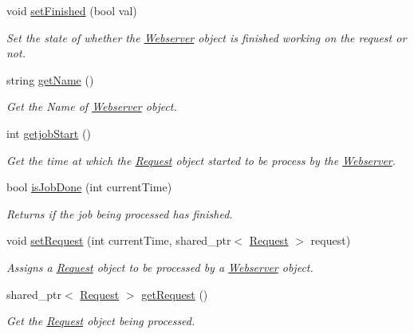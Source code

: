 \begin{DoxyCompactItemize}
void \hyperlink{classWebserver_a385a32307e09550c301660581bada2e5}{set\+Finished} (bool val)
\begin{DoxyCompactList}\small\item\em Set the state of whether the \hyperlink{classWebserver}{Webserver} object is finished working on the request or not. \end{DoxyCompactList}\item 
string \hyperlink{classWebserver_a7947099345655d9deceb05b37e06978c}{get\+Name} ()
\begin{DoxyCompactList}\small\item\em Get the Name of \hyperlink{classWebserver}{Webserver} object. \end{DoxyCompactList}\item 
int \hyperlink{classWebserver_ad1ee2d5ae63d1d2674156eb29c3f92ee}{getjob\+Start} ()
\begin{DoxyCompactList}\small\item\em Get the time at which the \hyperlink{classRequest}{Request} object started to be process by the \hyperlink{classWebserver}{Webserver}. \end{DoxyCompactList}\item 
bool \hyperlink{classWebserver_a25d0b2f418c84058bb49408aacee9745}{is\+Job\+Done} (int current\+Time)
\begin{DoxyCompactList}\small\item\em Returns if the job being processed has finished. \end{DoxyCompactList}\item 
void \hyperlink{classWebserver_af579724e554c818287932988c0de111e}{set\+Request} (int current\+Time, shared\+\_\+ptr$<$ \hyperlink{classRequest}{Request} $>$ request)
\begin{DoxyCompactList}\small\item\em Assigns a \hyperlink{classRequest}{Request} object to be processed by a \hyperlink{classWebserver}{Webserver} object. \end{DoxyCompactList}\item 
shared\+\_\+ptr$<$ \hyperlink{classRequest}{Request} $>$ \hyperlink{classWebserver_ad885e697f7623ae3b775664406f57cd0}{get\+Request} ()
\begin{DoxyCompactList}\small\item\em Get the \hyperlink{classRequest}{Request} object being processed. \end{DoxyCompactList}\end{DoxyCompactItemize}


